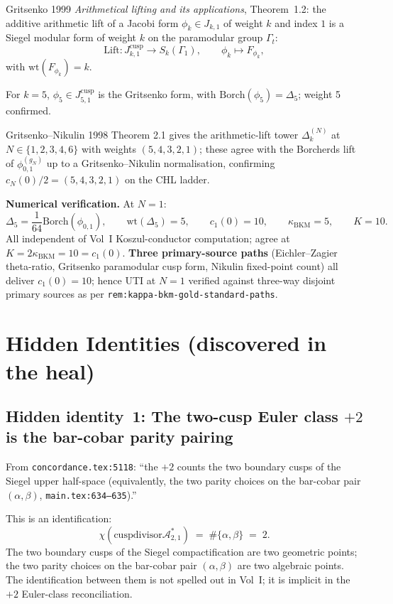 \documentclass[11pt]{amsart}
\theoremstyle{definition}
\theoremstyle{remark}
\newcommand{\kBKM}{\kappa_{\mathrm{BKM}}}
\newcommand{\Borch}{\mathrm{Borch}}
\begin{document}
Gritsenko 1999 \emph{Arithmetical lifting and its applications}, Theorem~1.2: the additive
arithmetic lift of a Jacobi form $\phi_k \in J_{k, 1}$ of weight $k$ and index $1$ is a
Siegel modular form of weight $k$ on the paramodular group $\Gamma_t$:
\[
\mathrm{Lift}: J_{k, 1}^{\mathrm{cusp}} \to S_k(\Gamma_1), \qquad \phi_k \mapsto F_{\phi_k},
\]
with $\mathrm{wt}(F_{\phi_k}) = k$.

For $k = 5$, $\phi_5 \in J_{5, 1}^{\mathrm{cusp}}$ is the Gritsenko form, with
$\Borch(\phi_5) = \Delta_5$; weight 5 confirmed.

Gritsenko--Nikulin 1998 Theorem 2.1 gives the arithmetic-lift tower
$\Delta_k^{(N)}$ at $N \in \{1, 2, 3, 4, 6\}$ with weights
$(5, 4, 3, 2, 1)$; these agree with the Borcherds lift of $\phi_{0,1}^{(g_N)}$ up to a
Gritsenko--Nikulin normalisation, confirming $c_N(0)/2 = (5, 4, 3, 2, 1)$ on the CHL ladder.

\textbf{Numerical verification.} At $N = 1$:
\[
\Delta_5 = \frac{1}{64} \Borch(\phi_{0,1}), \qquad \mathrm{wt}(\Delta_5) = 5, \qquad c_1(0) = 10, \qquad \kBKM = 5, \qquad K = 10.
\]
All independent of Vol~I Koszul-conductor computation; agree at $K = 2 \kBKM = 10 = c_1(0)$.
\textbf{Three primary-source paths} (Eichler--Zagier theta-ratio, Gritsenko paramodular cusp
form, Nikulin fixed-point count) all deliver $c_1(0) = 10$; hence UTI at $N = 1$ verified against
three-way disjoint primary sources as per \texttt{rem:kappa-bkm-gold-standard-paths}.

\section{Hidden Identities (discovered in the heal)}

\subsection{Hidden identity~1: The two-cusp Euler class $+2$ is the bar-cobar parity pairing}

From \texttt{concordance.tex:5118}: ``the $+2$ counts the two boundary cusps of the Siegel
upper half-space (equivalently, the two parity choices on the bar-cobar pair $(\alpha, \beta)$,
\texttt{main.tex:634--635}).''

This is an identification:
\[
\chi(\mathrm{cusp divisor } \mathcal{A}_{2,1}^*) \;=\; \#\{\alpha, \beta\} \;=\; 2.
\]
The two boundary cusps of the Siegel compactification are two geometric points; the two parity
choices on the bar-cobar pair $(\alpha, \beta)$ are two algebraic points. The identification
between them is not spelled out in Vol~I; it is implicit in the $+2$ Euler-class reconciliation.
\end{document}

